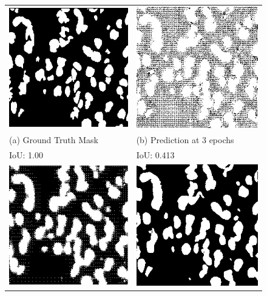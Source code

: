 \documentclass{article}
\begin{document}
\begin{figure}[htbp]
\vskip 2mm
\begin{tabular}{ll}
  \includegraphics[scale=0.56]{mlp-cw3-template/Figures/ground_truth_nuclei.jpg} &   \includegraphics[scale=0.56]{mlp-cw3-template/Figures/fuzzy_prediction.jpg} \\
(a) Ground Truth Mask & (b) Prediction at 3 epochs\\[6pt]
IoU: 1.00 & IoU: 0.413 \\[6pt]
 \includegraphics[scale=0.56]{mlp-cw3-template/Figures/predicted_nuclei.jpg} &   \includegraphics[scale=0.56]{mlp-cw3-template/Figures/great_prediction.jpg} \\

\end{tabular}
\end{figure}
\end{document}
